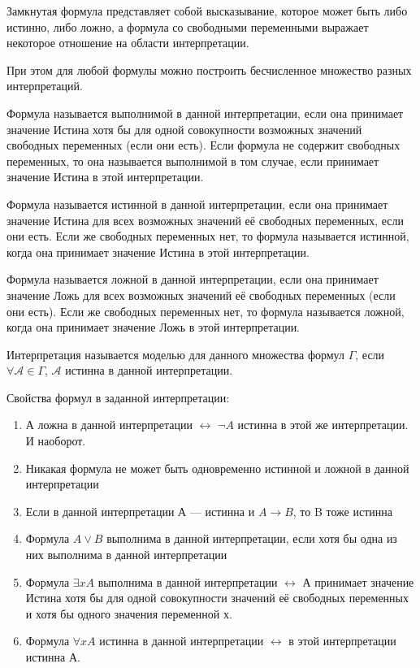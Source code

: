 Замкнутая формула представляет собой высказывание, которое может быть либо
истинно, либо ложно, а формула со свободными переменными выражает некоторое
отношение на области интерпретации.

При этом для любой формулы можно построить бесчисленное множество разных
интерпретаций.

\begin{definition}
	Формула называется выполнимой в данной интерпретации, если она принимает
	значение Истина хотя бы для одной совокупности возможных значений
	свободных переменных (если они есть). Если формула не содержит свободных
	переменных, то она называется выполнимой в том случае, если принимает
	значение Истина в этой интерпретации.
\end{definition}

\begin{definition}
	Формула называется истинной в данной интерпретации, если она принимает
	значение Истина для всех возможных значений её свободных переменных,
	если они есть. Если же свободных переменных нет, то формула называется
	истинной, когда она принимает значение Истина в этой интерпретации.
\end{definition}

\begin{definition}
	Формула называется ложной в данной интерпретации, если она принимает
	значение Ложь для всех возможных значений её свободных переменных (если
	они есть). Если же свободных переменных нет, то формула называется
	ложной, когда она принимает значение Ложь в этой интерпретации.
\end{definition}

\begin{definition}
Интерпретация называется моделью для данного множества формул $\Gamma$, если
$\forall \mathcal{A} \in \Gamma$, $\mathcal{A}$ истинна в данной интерпретации.
\end{definition}

Свойства формул в заданной интерпретации:
\begin{enumerate}
\item А ложна в данной интерпретации $\leftrightarrow$ $\lnot A$  истинна в этой
	же интерпретации. И наоборот.
\item Никакая формула не может быть одновременно истинной и ложной в данной
	 интерпретации
\item Если в данной интерпретации А --- истинна и $A\to B$, то B тоже истинна
\item Формула $A\lor B$ выполнима в данной интерпретации, если хотя бы одна из
	них выполнима в данной интерпретации
\item Формула $\exists x A$ выполнима в данной интерпретации  $\leftrightarrow$
	А принимает значение Истина хотя бы для одной совокупности значений её
	свободных переменных и хотя бы одного значения переменной х.
\item Формула $\forall xA$ истинна в данной интерпретации  $\leftrightarrow$ в
	этой интерпретации истинна А.
\end{enumerate}


